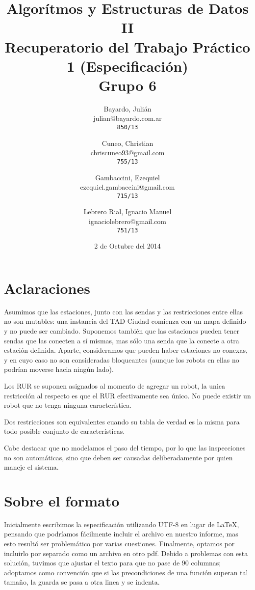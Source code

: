 \documentclass[a4paper,titlepage]{article}
\begin{document}
\title{Algorítmos y Estructuras de Datos II\\
Recuperatorio del Trabajo Práctico 1 (Especificación)\\
Grupo 6}

\author{
	Bayardo, Julián\\
	julian@bayardo.com.ar\\
	\texttt{850/13}
	\and
	Cuneo, Christian\\
	chriscuneo93@gmail.com\\
	\texttt{755/13}
	\and
	Gambaccini, Ezequiel\\
	ezequiel.gambaccini@gmail.com\\
	\texttt{715/13}
	\and
	Lebrero Rial, Ignacio Manuel\\
	ignaciolebrero@gmail.com\\
	\texttt{751/13}
}

\date{2 de Octubre del 2014}

\maketitle

\section{Aclaraciones}

Asumimos que las estaciones, junto con las sendas y las restricciones entre ellas no son mutables: una instancia del TAD Ciudad comienza con un mapa definido y no puede ser cambiado. Suponemos también que las estaciones pueden tener sendas que las conecten a sí mismas, mas sólo una senda que la conecte a otra estación definida. Aparte, consideramos que pueden haber estaciones no conexas, y en cuyo caso no son consideradas bloqueantes (aunque los robots en ellas no podrían moverse hacia ningún lado).

Los RUR se suponen asignados al momento de agregar un robot, la unica restricción al respecto es que el RUR efectivamente sea único. No puede existir un robot que no tenga ninguna característica.

Dos restricciones son equivalentes cuando su tabla de verdad es la misma para todo posible conjunto de características.

Cabe destacar que no modelamos el paso del tiempo, por lo que las inspecciones no son automáticas, sino que deben ser causadas deliberadamente por quien maneje el sistema.

\section{Sobre el formato}

Inicialmente escribimos la especificación utilizando UTF-8 en lugar de LaTeX, pensando que podríamos fácilmente incluir el archivo en nuestro informe, mas esto resultó ser problemático por varias cuestiones. Finalmente, optamos por incluirlo por separado como un archivo en otro pdf. Debido a problemas con esta solución, tuvimos que ajustar el texto para que no pase de 90 columnas; adoptamos como convención que si las precondiciones de una función superan tal tamaño, la guarda se pasa a otra linea y se indenta.


\end{document}
